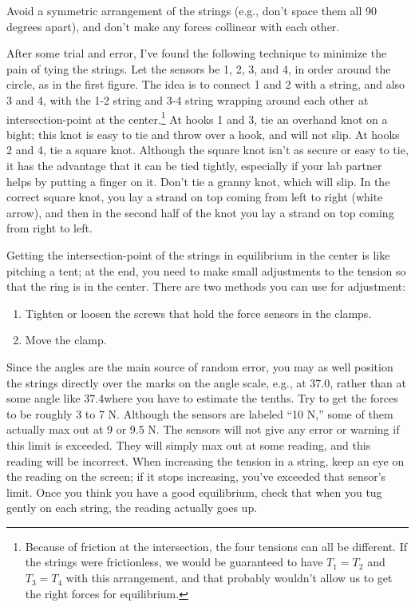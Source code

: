 Avoid a symmetric arrangement of
the strings (e.g., don't space them all 90 degrees apart), and
don't make any forces collinear with each other. 

After some trial and error, I've found the following technique to minimize the
pain of tying the strings. Let the sensors be 1, 2, 3, and 4, in order around the
circle, as in the first figure. The idea is to connect 1 and 2 with a string, and also
3 and 4, with the 1-2 string and 3-4 string wrapping around each other at intersection-point at the 
center.\footnote{Because of friction at the intersection, the four tensions can all be different.
If the strings
were frictionless, we would be guaranteed to have $T_1=T_2$ and $T_3=T_4$ with this arrangement, and
that probably wouldn't allow us to get the right forces for equilibrium.}
At hooks 1 and 3, tie an overhand knot on a bight; this knot is easy
to tie and throw over a hook, and will not slip. At hooks 2 and 4, tie a square knot. Although the
square knot isn't as secure or easy to tie, it has the advantage that it can be tied tightly,
especially if your lab partner helps by putting a finger on it. Don't tie a granny knot, which will slip.
In the correct square knot, you lay a strand on top coming from left to right (white arrow), and then
in the second half of the knot you lay a strand on top coming from right to left.



Getting the intersection-point of the strings
in equilibrium in the center is like pitching a tent; at the end, you need
to make small adjustments to the tension so that the ring is in the center.
There are two methods you can use for
adjustment:

\begin{enumerate}
\item Tighten or loosen the screws that hold the force sensors in the clamps.
\item Move the clamp.
\end{enumerate}

Since the angles are the main source
of random error, you may as well position the strings directly over the marks on the angle scale,
e.g., at 37.0\degunit, rather than at some angle like 37.4\degunit where you have to estimate the tenths.
Try to get the forces to be roughly 3 to 7 N.
Although the sensors are labeled ``10 N,'' some of them actually max out at 9 or 9.5 N.
The sensors will not give any
error or warning if this limit is exceeded. They will simply max out at some
reading, and this reading will be incorrect. When increasing the tension in a string, keep an eye
on the reading on the screen; if it stops increasing, you've exceeded that sensor's limit.
Once you think you have a good equilibrium, check that when you tug gently on each string, the
reading actually goes up.


